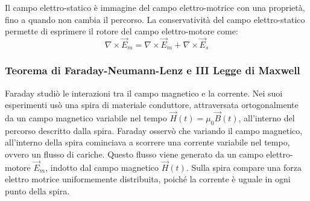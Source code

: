 \documentclass{article}
\numberwithin{equation}{subsection}
\begin{document}
Il campo elettro-statico è immagine del campo elettro-motrice con una proprietà, fino a quando non cambia il percorso. La conservatività del campo elettro-statico permette 
di esprimere il rotore del campo elettro-motore come:
\begin{equation*}
    \nabla\times\vec{E}_m=\nabla\times\vec{E}_m+\nabla\times\vec{E}_s
\end{equation*}

\subsubsection{Teorema di Faraday-Neumann-Lenz e III Legge di Maxwell}

Faraday studiò le interazioni tra il campo magnetico e la corrente. Nei suoi esperimenti usò una spira di materiale conduttore, attraversata ortogonalmente da un campo magnetico 
variabile nel tempo $\vec{H}(t)=\mu_0\vec{B}(t)$, all'interno del percorso descritto dalla spira. Faraday osservò che variando il campo magnetico, all'interno della spira 
cominciava a scorrere una corrente variabile nel tempo, ovvero un flusso di cariche. Questo flusso viene generato da un campo elettro-motore $\vec{E}_m$, indotto dal campo 
magnetico $\vec{H}(t)$. Sulla spira compare una forza elettro motrice uniformemente distribuita, poiché la corrente è uguale in ogni punto della spira. 

\begin{center}
\end{center}
\end{document}
